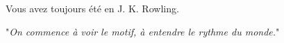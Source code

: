 Vous avez toujours été en J. K. Rowling.

"\emph{On commence à voir le motif, à entendre le rythme du monde.}"

